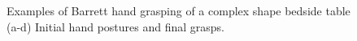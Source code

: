\begin{figure}
    \hspace{0.005in}
    \hspace{0.005in}


\caption{\scriptsize{Examples of Barrett hand grasping of a complex shape bedside table (a-d) Initial hand postures and final grasps. }}
\label{fig:result:bedside}
\end{figure}




